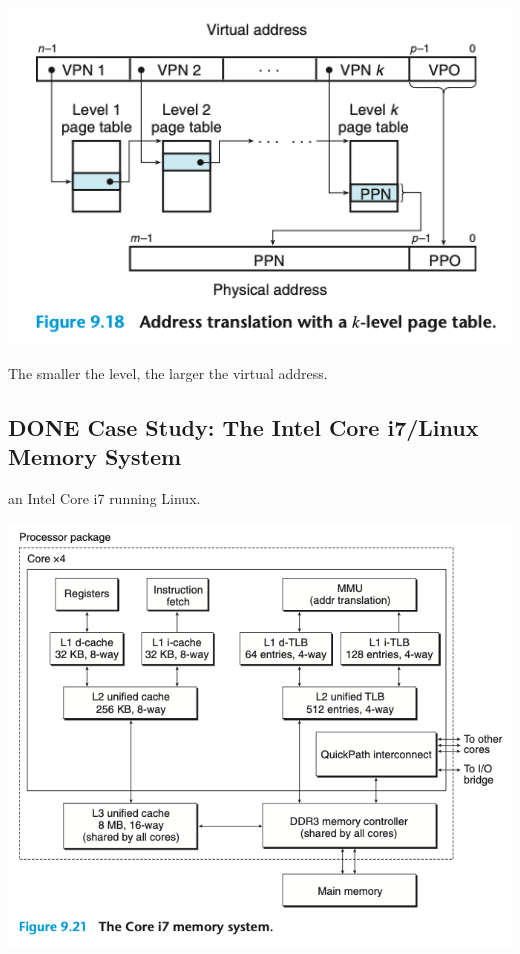 \documentclass[11pt]{article}
\begin{document}
\begin{center}
\includegraphics[width=.9\linewidth]{pics/figure9.18-address-translation.png}
\end{center}

The smaller the level, the larger the virtual address.\\


\subsection{{\bfseries\sffamily DONE} Case Study: The Intel Core i7/Linux Memory System}
\label{sec:orgf891d37}
an Intel Core i7 running Linux.\\

\begin{center}
\includegraphics[width=.9\linewidth]{pics/figure9.21-i7-memory.png}
\end{center}
\end{document}
